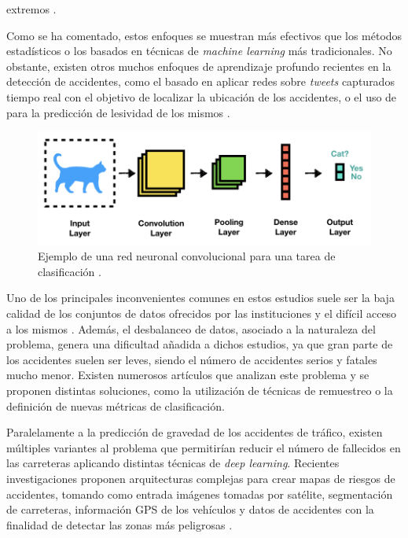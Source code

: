extremos \cite{WeatherClimateCNN2DEA}.

Como se ha comentado, estos enfoques se muestran más efectivos que los métodos estadísticos o los basados en técnicas de \textit{machine learning} más tradicionales. No obstante, existen otros muchos enfoques de aprendizaje profundo recientes en la detección de accidentes, como el basado en aplicar redes  sobre \textit{tweets} capturados tiempo real \cite{DeteccionDeAccidentesPorTweets} con el objetivo de localizar la ubicación de los accidentes, o el uso de  para la predicción de lesividad de los mismos \cite{RNNAccidentSeverityPrediction}.


\begin{figure}[h]
    \centering
    \includegraphics[width=15cm]{archivos/2.EstadoArte/CNNExample}
    \caption{Ejemplo de una red neuronal convolucional para una tarea de clasificación \cite{CNNExampleEAImage}.}
    \label{CNNExample}
\end{figure}


Uno de los principales inconvenientes comunes en estos estudios suele ser la baja calidad de los conjuntos de datos ofrecidos por las instituciones y el difícil acceso a los mismos \cite{ImportanciaDeBajaCalidadActualmenteDeDatasets}. Además, el desbalanceo de datos, asociado a la naturaleza del problema, genera una dificultad añadida a dichos estudios, ya que gran parte de los accidentes suelen ser leves, siendo el número de accidentes serios y fatales mucho menor. Existen numerosos artículos que analizan este problema y se proponen distintas soluciones, como la utilización de técnicas de remuestreo \cite{ItalianoMetricasDesbalanceo} o la definición de nuevas métricas de clasificación.


Paralelamente a la predicción de gravedad de los accidentes de tráfico, existen múltiples variantes al problema que permitirían reducir el número de fallecidos en las carreteras aplicando distintas técnicas de \textit{deep learning}. Recientes investigaciones proponen arquitecturas complejas para crear mapas de riesgos de accidentes, tomando como entrada imágenes tomadas por satélite, segmentación de carreteras, información GPS de los vehículos y datos de accidentes con la finalidad de detectar las zonas más peligrosas
\cite{MIT}.